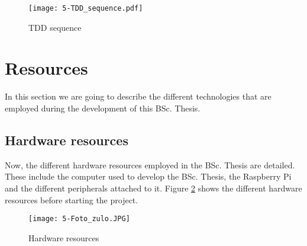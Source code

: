 \begin{figure}[!h]
	\begin{center}
		\texttt{[image: 5-TDD\_sequence.pdf]}
		\caption{TDD sequence}
		\label{fig:5-TDD_sequence}
	\end{center}
\end{figure}


\section{Resources} %
In this section we are going to describe the different technologies that are employed during the development of this \ac{BSc.} Thesis.

\subsection{Hardware resources}
Now, the different hardware resources employed in the \ac{BSc.} Thesis are detailed. These include the computer used to develop the \ac{BSc.} Thesis, the Raspberry Pi and the different peripherals attached to it. Figure \ref{fig:5-Foto_zulo} shows the different hardware resources before starting the project.


\begin{figure}[!h]
	\begin{center}
		\texttt{[image: 5-Foto\_zulo.JPG]}
		\caption{Hardware resources}
		\label{fig:5-Foto_zulo}
	\end{center}
\end{figure}


